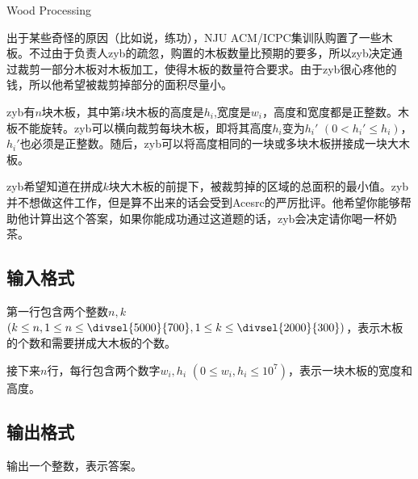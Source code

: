 \begin{Problem}{Wood Processing}{}

出于某些奇怪的原因（比如说，练功），NJU ACM/ICPC集训队购置了一些木板。不过由于负责人zyb的疏忽，购置的木板数量比预期的要多，所以zyb决定通过裁剪一部分木板对木板加工，使得木板的数量符合要求。由于zyb很心疼他的钱，所以他希望被裁剪掉部分的面积尽量小。

zyb有$n$块木板，其中第$i$块木板的高度是$h_i$,宽度是$w_i$，高度和宽度都是正整数。木板不能旋转。zyb可以横向裁剪每块木板，即将其高度$h_i$变为$h_i'$ $(0 < h_i' \leq h_i)$，$h_i'$也必须是正整数。随后，zyb可以将高度相同的一块或多块木板拼接成一块大木板。

zyb希望知道在拼成$k$块大木板的前提下，被裁剪掉的区域的总面积的最小值。zyb并不想做这件工作，但是算不出来的话会受到Acesrc的严厉批评。他希望你能够帮助他计算出这个答案，如果你能成功通过这道题的话，zyb会决定请你喝一杯奶茶。

\subsection*{输入格式}

第一行包含两个整数$n, k$ $(k \leq n, 1 \leq n \leq \divsel{5000}{700}, 1 \leq k \leq \divsel{2000}{300})$，表示木板的个数和需要拼成大木板的个数。

接下来$n$行，每行包含两个数字$w_i, h_i$ $(0 \leq w_i, h_i \leq 10^7)$，表示一块木板的宽度和高度。

\subsection*{输出格式}

输出一个整数，表示答案。


\end{Problem}

